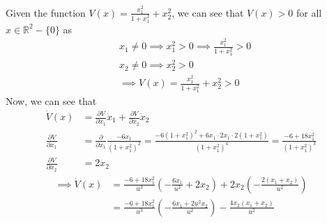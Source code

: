 Given the function \( \displaystyle V(x) = \frac{x_1^2}{1 + x_1^2} + x_2^2 \), we can see that \( V(x) > 0 \) for all \( x \in \mathbb{R}^2 - \{ 0 \} \) as
\begin{align*}
     &
    x_1 \neq 0
    \implies
    x_1^2 > 0
    \implies
    \frac{x_1^2}{1 + x_1^2} > 0
    \\ &
    x_2 \neq 0
    \implies
    x_2^2 > 0
    \\ &
    \implies
    V(x) =
    \frac{x_1^2}{1 + x_1^2} + x_2^2
    > 0
\end{align*}
Now, we can see that
\begin{align*}
    \dot{V}(x)
     & =
    \frac{\partial V}{\partial x_1} \dot{x}_1 + \frac{\partial V}{\partial x_2} \dot{x}_2
    \\
    \frac{\partial V}{\partial x_1}
     & =
    \frac{\partial}{\partial x_1} \frac{- 6 x_{1}}{{(1 + x_{1}^{2})}^2}
    =
    \frac{- 6{(1 + x_{1}^{2})}^2 + 6 x_1 \cdot 2 x_1 \cdot 2(1 + x_{1}^{2})}
    {{(1 + x_{1}^{2})}^4}
    =
    \frac{- 6 + 18 x_1^2}
    {{(1 + x_{1}^{2})}^3}
    \\
    \frac{\partial V}{\partial x_2}
     & =
    2 x_2
\end{align*}
\begin{align*}
    \implies
    \dot{V}(x)
     & =
    \frac{- 6 + 18 x_1^2}{u^3} \left( -\frac{6 x_{1}}{u^{2}} + 2 x_{2} \right) + 2 x_2 \left( -\frac{2(x_{1} + x_{2})}{u^{2}} \right)
    \\ & =
    \frac{- 6 + 18 x_1^2}{u^3} \left( -\frac{6 x_{1} + 2 u^{2} x_{2}}{u^{2}} \right) - \frac{4 x_2(x_{1} + x_{2})}{u^{2}}
\end{align*}
